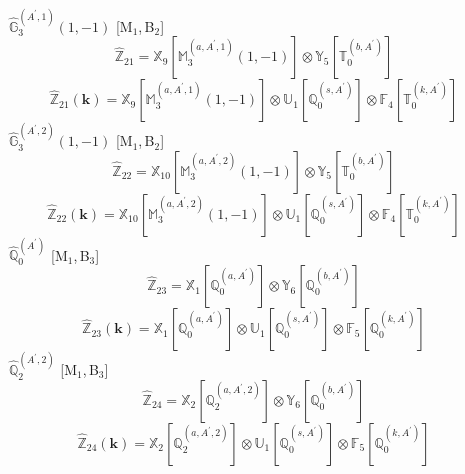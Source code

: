 \documentclass[fleqn,10pt,landscape]{article}
\begin{document}
\begin{itemize}
\begin{dmath*}
\end{dmath*}
\vspace{4mm}
\noindent {} $\,\,\,\hat{\mathbb{G}}_{3}^{(A^{\prime},1)}(1,-1)$ [M$_{1}$,\,B$_{2}$]
\begin{dmath*}
\hat{\mathbb{Z}}_{21}=\mathbb{X}_{9}[\mathbb{M}_{3}^{(a,A^{\prime},1)}(1,-1)] \otimes\mathbb{Y}_{5}[\mathbb{T}_{0}^{(b,A^{\prime})}]
\end{dmath*}
\begin{dmath*}
\hat{\mathbb{Z}}_{21}(\bm{k})=\mathbb{X}_{9}[\mathbb{M}_{3}^{(a,A^{\prime},1)}(1,-1)] \otimes\mathbb{U}_{1}[\mathbb{Q}_{0}^{(s,A^{\prime})}] \otimes\mathbb{F}_{4}[\mathbb{T}_{0}^{(k,A^{\prime})}]
\end{dmath*}
\vspace{4mm}
\noindent {} $\,\,\,\hat{\mathbb{G}}_{3}^{(A^{\prime},2)}(1,-1)$ [M$_{1}$,\,B$_{2}$]
\begin{dmath*}
\hat{\mathbb{Z}}_{22}=\mathbb{X}_{10}[\mathbb{M}_{3}^{(a,A^{\prime},2)}(1,-1)] \otimes\mathbb{Y}_{5}[\mathbb{T}_{0}^{(b,A^{\prime})}]
\end{dmath*}
\begin{dmath*}
\hat{\mathbb{Z}}_{22}(\bm{k})=\mathbb{X}_{10}[\mathbb{M}_{3}^{(a,A^{\prime},2)}(1,-1)] \otimes\mathbb{U}_{1}[\mathbb{Q}_{0}^{(s,A^{\prime})}] \otimes\mathbb{F}_{4}[\mathbb{T}_{0}^{(k,A^{\prime})}]
\end{dmath*}
\vspace{4mm}
\noindent {} $\,\,\,\hat{\mathbb{Q}}_{0}^{(A^{\prime})}$ [M$_{1}$,\,B$_{3}$]
\begin{dmath*}
\hat{\mathbb{Z}}_{23}=\mathbb{X}_{1}[\mathbb{Q}_{0}^{(a,A^{\prime})}] \otimes\mathbb{Y}_{6}[\mathbb{Q}_{0}^{(b,A^{\prime})}]
\end{dmath*}
\begin{dmath*}
\hat{\mathbb{Z}}_{23}(\bm{k})=\mathbb{X}_{1}[\mathbb{Q}_{0}^{(a,A^{\prime})}] \otimes\mathbb{U}_{1}[\mathbb{Q}_{0}^{(s,A^{\prime})}] \otimes\mathbb{F}_{5}[\mathbb{Q}_{0}^{(k,A^{\prime})}]
\end{dmath*}
\vspace{4mm}
\noindent {} $\,\,\,\hat{\mathbb{Q}}_{2}^{(A^{\prime},2)}$ [M$_{1}$,\,B$_{3}$]
\begin{dmath*}
\hat{\mathbb{Z}}_{24}=\mathbb{X}_{2}[\mathbb{Q}_{2}^{(a,A^{\prime},2)}] \otimes\mathbb{Y}_{6}[\mathbb{Q}_{0}^{(b,A^{\prime})}]
\end{dmath*}
\begin{dmath*}
\hat{\mathbb{Z}}_{24}(\bm{k})=\mathbb{X}_{2}[\mathbb{Q}_{2}^{(a,A^{\prime},2)}] \otimes\mathbb{U}_{1}[\mathbb{Q}_{0}^{(s,A^{\prime})}] \otimes\mathbb{F}_{5}[\mathbb{Q}_{0}^{(k,A^{\prime})}]

\end{dmath*}
\end{itemize}
\end{document}
